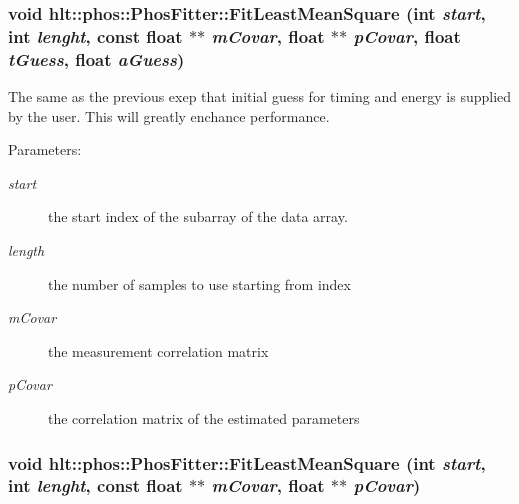 \subsubsection{\setlength{\rightskip}{0pt plus 5cm}void hlt::phos::Phos\-Fitter::Fit\-Least\-Mean\-Square (int {\em start}, int {\em lenght}, const float $\ast$$\ast$ {\em m\-Covar}, float $\ast$$\ast$ {\em p\-Covar}, float {\em t\-Guess}, float {\em a\-Guess})}\label{classhlt_1_1phos_1_1PhosFitter_a9}


The same as the previous exep that initial guess for timing and energy is supplied by the user. This will greatly enchance performance. \begin{Desc}
\item[Parameters:]
\begin{description}
\item[{\em start}]the start index of the subarray of the data array. \item[{\em length}]the number of samples to use starting from index \item[{\em m\-Covar}]the measurement correlation matrix \item[{\em p\-Covar}]the correlation matrix of the estimated parameters \end{description}
\end{Desc}
\subsubsection{\setlength{\rightskip}{0pt plus 5cm}void hlt::phos::Phos\-Fitter::Fit\-Least\-Mean\-Square (int {\em start}, int {\em lenght}, const float $\ast$$\ast$ {\em m\-Covar}, float $\ast$$\ast$ {\em p\-Covar})}\label{classhlt_1_1phos_1_1PhosFitter_a8}


